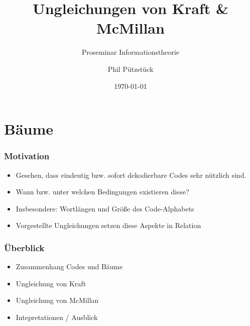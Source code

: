 \documentclass{beamer}
\title{Ungleichungen von Kraft \& McMillan}
\subtitle{Proseminar Informationstheorie}
\author{Phil Pützstück}
\date{\today}
\begin{document}
\maketitle

\section{Bäume}
\begin{frame}
    \frametitle{Motivation}
    \begin{itemize}
        \setlength\itemsep{2em}
        \item Gesehen, dass eindeutig bzw. sofort dekodierbare Codes sehr nützlich sind.
        \item Wann bzw. unter welchen Bedingungen existieren diese?
        \item Insbesondere: Wortlängen und Größe des Code-Alphabets
        \item Vorgestellte Ungleichungen setzen diese Aspekte in Relation
    \end{itemize}
\end{frame}

\begin{frame}
    \frametitle{Überblick}
    \begin{itemize}
        \setlength\itemsep{2em}
        \item Zusammenhang Codes und Bäume
        \item Ungleichung von Kraft
        \item Ungleichung von McMillan
        \item Intepretationen / Ausblick
    \end{itemize}
\end{frame}
\end{document}
